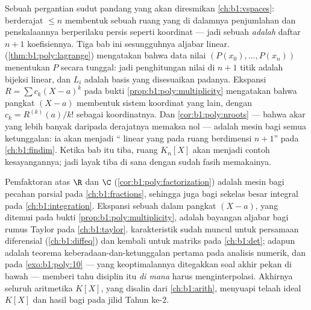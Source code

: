 \begin{remark}\label{rem:b1:poly:interlude}
Sebuah pergantian sudut pandang yang akan diresmikan \cref{ch:b1:vspaces}:
 berderajat $\leq n$ membentuk sebuah ruang yang di dalamnya
penjumlahan dan penskalaannya berperilaku persis seperti koordinat ---
jadi sebuah  \emph{adalah} daftar $n + 1$ koefisiennya. Tiga
 bab ini sesungguhnya aljabar linear.
 (\cref{thm:b1:poly:lagrange}) mengatakan bahwa
data nilai $(P(x_0), \dots, P(x_n))$ menentukan $P$
secara tunggal: jadi penghitungan nilai di $n + 1$ titik adalah bijeksi linear,
dan $L_i$ adalah basis yang disesuaikan padanya. Ekspansi $R =
\sum c_k(X - a)^k$ pada bukti
\cref{prop:b1:poly:multiplicity} mengatakan bahwa pangkat
$(X - a)$ membentuk sistem koordinat yang lain, dengan $c_k =
R^{(k)}(a)/k!$ sebagai koordinatnya. Dan
\cref{cor:b1:poly:nroots} --- bahwa akar yang lebih banyak daripada derajatnya memaksa
 nol --- adalah mesin bagi semua ketunggalan: ia akan
menjadi `` linear yang  pada ruang berdimensi $n + 1$''
pada \cref{ch:b1:findim}. Ketika bab itu tiba, ruang
$K_n[X]$ akan menjadi contoh kesayangannya; jadi layak tiba
di sana dengan sudah fasih memakainya.
\end{remark}

\begin{remark}\label{rem:b1:poly:whereused}
Pemfaktoran atas $\R$ dan $\C$
(\cref{cor:b1:poly:factorization}) adalah mesin bagi pecahan
parsial pada \cref{ch:b1:fractions}, sehingga juga bagi sekelas besar
integral pada \cref{ch:b1:integration}. Ekspansi sebuah
 dalam pangkat $(X - a)$, yang ditemui pada bukti
\cref{prop:b1:poly:multiplicity}, adalah bayangan aljabar bagi
rumus Taylor pada \cref{ch:b1:taylor}.  karakteristik
sudah muncul untuk persamaan diferensial (\cref{ch:b1:diffeq})
dan kembali untuk matriks pada \cref{ch:b1:det}; adapun  adalah teorema keberadaan-dan-ketunggalan pertama pada
analisis numerik, dan  pada
\cref{exo:b1:poly:10} --- yang keoptimalannya ditegakkan soal akhir pekan
di bawah --- memberi tahu disiplin itu \emph{di mana} harus
menginterpolasi. Akhirnya seluruh aritmetika $K[X]$, yang disalin dari
\cref{ch:b1:arith}, menyuapi telaah ideal $K[X]$ dan  hasil
bagi pada jilid Tahun ke-2.
\end{remark}


